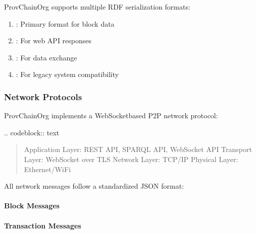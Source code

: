 \documentclass[letterpaper,10pt,english]{sphinxmanual}
\begin{document}
\sphinxAtStartPar
{}
ProvChainOrg supports multiple RDF serialization formats:
\begin{enumerate}
%
\item {} 
\sphinxAtStartPar
{}: Primary format for block data

\item {} 
\sphinxAtStartPar
{}: For web API responses

\item {} 
\sphinxAtStartPar
{}: For data exchange

\item {} 
\sphinxAtStartPar
{}: For legacy system compatibility

\end{enumerate}


\subsubsection{Network Protocols}
\label{\detokenize{research/technical-specifications:network-protocols}}
\sphinxAtStartPar
ProvChainOrg implements a WebSocket\sphinxhyphen{}based P2P network protocol:

\sphinxAtStartPar
{}
.. code\sphinxhyphen{}block:: text
\begin{quote}

\sphinxAtStartPar
Application Layer:  REST API, SPARQL API, WebSocket API
Transport Layer:    WebSocket over TLS
Network Layer:      TCP/IP
Physical Layer:     Ethernet/WiFi
\end{quote}

\sphinxAtStartPar
{}
All network messages follow a standardized JSON format:

\sphinxAtStartPar
{}


\paragraph{Block Messages}
\label{\detokenize{research/technical-specifications:block-messages}}

\paragraph{Transaction Messages}
\label{\detokenize{research/technical-specifications:transaction-messages}}
\end{document}
